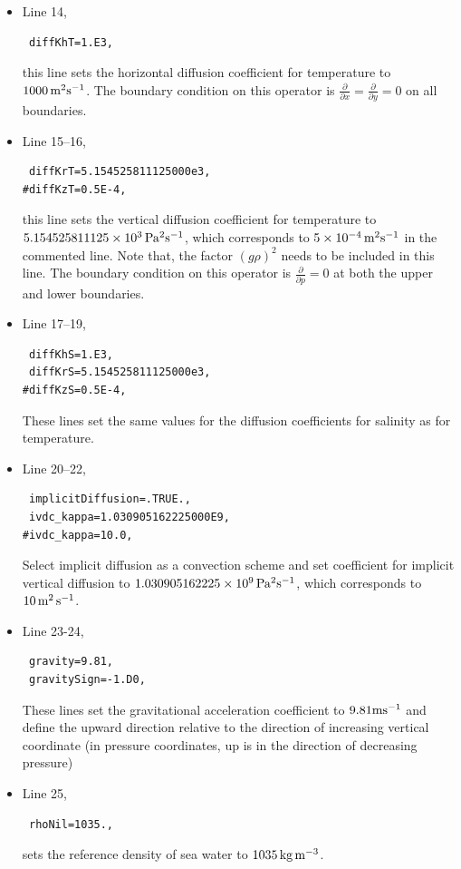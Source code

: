 {\begin{itemize}
\item Line 14,
\begin{verbatim}
 diffKhT=1.E3,
\end{verbatim}
  this line sets the horizontal diffusion coefficient for temperature
  to $1000\,{\rm m^{2}s^{-1}}$. The boundary condition on this
  operator is $\frac{\partial}{\partial x}=\frac{\partial}{\partial
    y}=0$ on all boundaries.

\item Line 15--16,
\begin{verbatim}
 diffKrT=5.154525811125000e3,
#diffKzT=0.5E-4,
\end{verbatim}
  this line sets the vertical diffusion coefficient for temperature to
  $5.154525811125 \times 10^{3}\,{\rm Pa^{2}s^{-1}}$, which
  corresponds to $5\times10^{-4}\mbox{\,m$^{2}$s$^{-1}$}$ in the commented
  line. Note that, the factor $(g\rho)^2$ needs to be included in this
  line. The boundary condition on this operator is
  $\frac{\partial}{\partial p}=0$ at both the upper and lower
  boundaries.

\item Line 17--19,
\begin{verbatim}
 diffKhS=1.E3,
 diffKrS=5.154525811125000e3,
#diffKzS=0.5E-4,
\end{verbatim}
These lines set the same values for the diffusion coefficients for
salinity as for temperature.

\item Line 20--22,
\begin{verbatim}
 implicitDiffusion=.TRUE.,
 ivdc_kappa=1.030905162225000E9,
#ivdc_kappa=10.0,
\end{verbatim}
Select implicit diffusion as a convection scheme and set coefficient
for implicit vertical diffusion to $1.030905162225\times10^{9}\,{\rm
  Pa^{2}s^{-1}}$, which corresponds to $10\mbox{\,m$^{2}$\,s$^{-1}$}$.

\item Line 23-24,
\begin{verbatim}
 gravity=9.81,
 gravitySign=-1.D0,
\end{verbatim}
  These lines set the gravitational acceleration coefficient to
  $9.81{\rm m}{\rm s}^{-1}$ and define the upward direction relative
  to the direction of increasing vertical coordinate (in pressure
  coordinates, up is in the direction of decreasing pressure)
\item Line 25,
\begin{verbatim}
 rhoNil=1035.,
\end{verbatim}
  sets the reference density of sea water to $1035\mbox{\,kg\,m$^{-3}$}$.\\


\end{itemize}}
